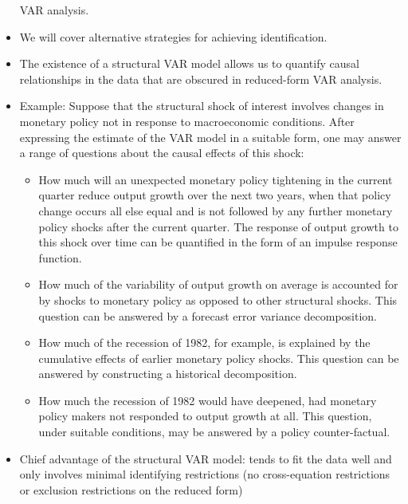 \documentclass[]{scrartcl}
\begin{document}
\begin{itemize}
VAR analysis. 
	\item We will cover alternative strategies for
achieving identification. 
	\item The existence of a structural VAR model allows us to quantify causal relationships in the data that are obscured
in reduced-form VAR analysis. 
	\item Example: Suppose that the structural shock of interest involves changes in
	monetary policy not in response to macroeconomic conditions. After expressing
	the estimate of the VAR model in a suitable form, one may answer a range of
	questions about the causal effects of this shock: 
	\begin{itemize}
		\item How much will an unexpected monetary policy tightening in
the current quarter reduce output growth over the next two years,
when that policy change occurs all else equal and is not followed by any
further monetary policy shocks after the current quarter. The response of
output growth to this shock over time can be quantified in the form of an
impulse response function.
		\item How much of the variability of output growth on average
is accounted for by shocks to monetary policy as opposed to other structural shocks. This question can be answered by a forecast error variance
decomposition.
		\item How much of the recession of 1982, for example, is explained
by the cumulative effects of earlier monetary policy shocks. This question
can be answered by constructing a historical decomposition.
		\item How much the recession of 1982 would have deepened, had monetary policy makers not responded to output growth at all. This question, under suitable conditions, may be answered by a policy
counter-factual.
	\end{itemize}
	\item Chief advantage of the structural VAR model: tends to fit the data
	well and only involves minimal identifying restrictions (no cross-equation restrictions or exclusion restrictions on the reduced form)
\end{itemize}
\end{document}
